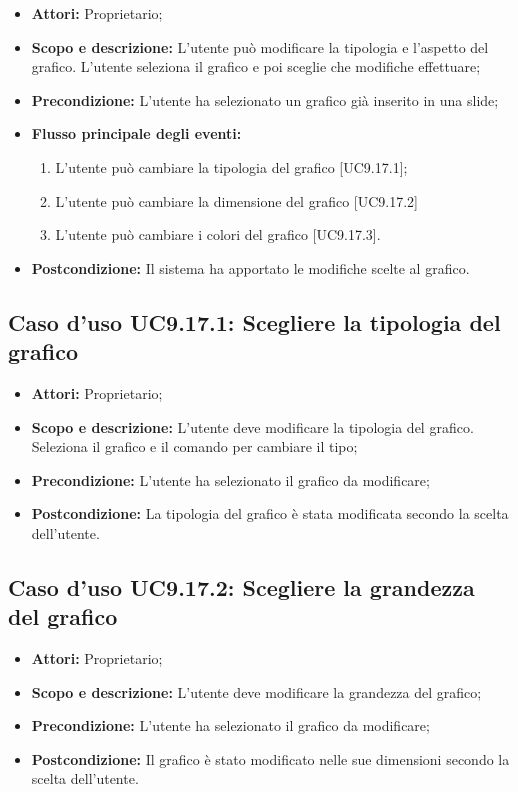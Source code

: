 	\begin{itemize}
		\item \textbf{Attori:} Proprietario;
		\item \textbf{Scopo e descrizione:} L'utente può modificare la tipologia e l'aspetto del grafico. L'utente seleziona il grafico e poi sceglie che modifiche effettuare;
		\item \textbf{Precondizione:} L'utente ha selezionato un grafico già inserito in una \gls{slide};
		\item \textbf{Flusso principale degli eventi:}
		\begin{enumerate}
			\item L'utente può cambiare la tipologia del grafico [UC9.17.1];
			\item L'utente può cambiare la dimensione del grafico [UC9.17.2]
			\item L'utente può cambiare i colori del grafico [UC9.17.3].
		\end{enumerate}
		\item \textbf{Postcondizione:} Il sistema ha apportato le modifiche scelte al grafico.
	\end{itemize}

		\subsection{Caso d'uso UC9.17.1: Scegliere la tipologia del grafico}
		\begin{itemize}
			\item \textbf{Attori:} Proprietario;
			\item \textbf{Scopo e descrizione:} L'utente deve modificare la tipologia del grafico. Seleziona il grafico e il comando per cambiare il tipo;
			\item \textbf{Precondizione:} L'utente ha selezionato il grafico da modificare;
			\item \textbf{Postcondizione:} La tipologia del grafico è stata modificata secondo la scelta dell'utente.
		\end{itemize}
		
		\subsection{Caso d'uso UC9.17.2: Scegliere la grandezza del grafico}
		\begin{itemize}
			\item \textbf{Attori:} Proprietario;
			\item \textbf{Scopo e descrizione:} L'utente deve modificare la grandezza del grafico;
			\item \textbf{Precondizione:} L'utente ha selezionato il grafico da modificare;
			\item \textbf{Postcondizione:} Il grafico è stato modificato nelle sue dimensioni secondo la scelta dell'utente.
		\end{itemize}
		
